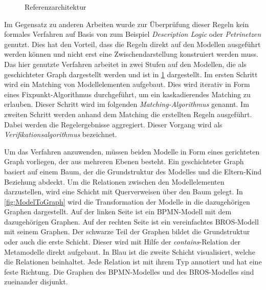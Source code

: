 \begin{figure}[b]
%
    \caption{Referenzarchitektur}%
    \label{fig:consistencySymbolicPicture}
\end{figure}

Im Gegensatz zu anderen Arbeiten wurde zur Überprüfung dieser Regeln kein formales Verfahren auf Basis von zum Beispiel \emph{Description Logic} oder \emph{Petrinetzen} genutzt.
Dies hat den Vorteil, dass die Regeln direkt auf den Modellen ausgeführt werden können und nicht erst eine Zwischendarstellung konstruiert werden muss.
Das hier genutzte Verfahren arbeitet in zwei Stufen auf den Modellen, die als geschichteter Graph dargestellt werden und ist in \cref{fig:consistencySymbolicPicture} dargestellt.
Im ersten Schritt wird ein Matching von Modellelementen aufgebaut.
Dies wird iterativ in Form eines Fixpunkt-Algorithmus durchgeführt, um ein kaskadierendes Matching zu erlauben.
Dieser Schritt wird im folgenden \emph{Matching-Algorithmus} genannt.
Im zweiten Schritt werden anhand dem Matching die erstellten Regeln ausgeführt.
Dabei werden die Regelergebnisse aggregiert.
Dieser Vorgang wird als \emph{Verifikationsalgorithmus} bezeichnet.

Um das Verfahren anzuwenden, müssen beiden Modelle in Form eines gerichteten Graph vorliegen, der aus mehreren Ebenen besteht.
Ein geschichteter Graph basiert auf einem Baum, der die Grundstruktur des Modelles und die Eltern-Kind Beziehung abdeckt.
Um die Relationen zwischen den Modellelementen darzustellen, wird eine Schicht mit Querverweisen über den Baum gelegt.
In \cref{fig:ModelToGraph} wird die Transformation der Modelle in die dazugehörigen Graphen dargestellt.
Auf der linken Seite ist ein BPMN-Modell mit dem dazugehörigen Graphen. 
Auf der rechten Seite ist ein vereinfachtes BROS-Modell mit seinem Graphen.
Der schwarze Teil der Graphen bildet die Grundstruktur oder auch die erste Schicht.
Dieser wird mit Hilfe der \emph{contains}-Relation der Metamodelle direkt aufgebaut.
In Blau ist die zweite Schicht visualisiert, welche die Relationen beinhaltet.
Jede Relation ist mit ihrem Typ annotiert und hat eine feste Richtung.
Die Graphen des BPMN-Modelles und des BROS-Modelles sind zueinander disjunkt.

